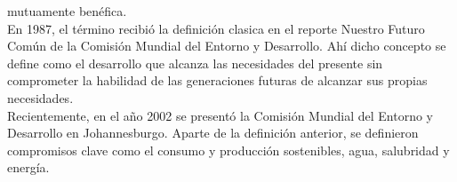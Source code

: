 \documentclass[letterpaper, 12pt]{article}
\begin{document}
    mutuamente benéfica.
    \\\newline
    \noindent En 1987, el término recibió la definición clasica en el reporte Nuestro Futuro Común de la Comisión Mundial del Entorno y Desarrollo. Ahí dicho concepto se define como el desarrollo que alcanza las necesidades del presente sin comprometer la habilidad de las generaciones futuras de alcanzar sus propias necesidades.
    \\\newline
    \noindent Recientemente, en el año 2002 se presentó la Comisión Mundial del Entorno y Desarrollo en Johannesburgo. Aparte de la definición anterior, se definieron compromisos clave como el consumo y producción sostenibles, agua, salubridad y energía. 
    \cleardoublepage

        \thispagestyle{fancy}
        \nocite{*}
        

        
\end{document}
